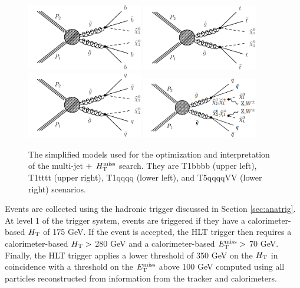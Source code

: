 \begin{figure}[h]
\centering
\includegraphics[width=0.45\textwidth]{figures/SusySearches/Ra2b2015/T1bbbb.pdf}
\includegraphics[width=0.45\textwidth]{figures/SusySearches/Ra2b2015/T1tttt.pdf}\\
\includegraphics[width=0.45\textwidth]{figures/SusySearches/Ra2b2015/T1qqqq.pdf}
\includegraphics[width=0.45\textwidth]{figures/SusySearches/Ra2b2015/T5vv.pdf}
\caption{
  The simplified models used for the optimization and interpretation of the multi-jet $+$ $H_{\text{T}}^{\rm miss}$ search. 
  They are T1bbbb (upper left), T1tttt (upper right), T1qqqq (lower left), and T5qqqqVV (lower right) scenarios.
}
\label{fig:Ra2bSMS}
\end{figure}

Events are collected using the hadronic trigger discussed in Section \ref{sec:anatrig}. At level 1 of the trigger system, events are triggered if they have a calorimeter-based $H_{\rm T}$ of 175 GeV. If the event is accepted, the
HLT trigger then requires a calorimeter-based $H_{\rm T}>$ 280 GeV and a calorimeter-based $E_{\text{T}}^{\rm miss}>$ 70 GeV. Finally, the HLT trigger applies a lower threshold of 350 GeV on the $H_{\rm T}$ in coincidence with a threshold on the $E_{\text{T}}^{\rm miss}$ above 100 GeV computed using all particles reconstructed from information from the tracker and calorimeters.

